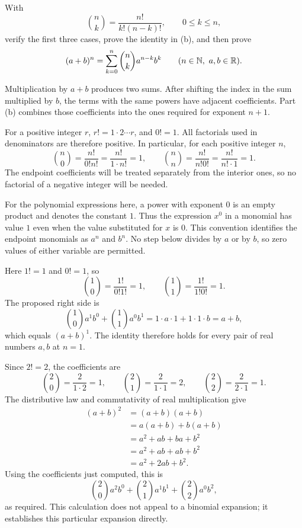 

\goal With
\[
 \binom{n}{k}=\frac{n!}{k!(n-k)!},\qquad 0\leq k\leq n,
\]
verify the first three cases, prove the identity in (b), and then prove
\[
 (a+b)^n=\sum_{k=0}^{n}\binom{n}{k}a^{n-k}b^k
 \qquad(n\in\mathbb{N},\ a,b\in\mathbb{R}).
\]

\idea Multiplication by $a+b$ produces two sums. After shifting
the index in the sum multiplied by $b$, the terms with the same powers
have adjacent coefficients. Part (b) combines those coefficients into
the ones required for exponent $n+1$.

For a positive integer $r$, $r!=1\cdot2\cdots r$, and $0!=1$.
All factorials used in denominators are therefore positive. In particular,
for each positive integer $n$,
\[
 \binom{n}{0}=\frac{n!}{0!n!}
 =\frac{n!}{1\cdot n!}=1,
 \qquad
 \binom{n}{n}=\frac{n!}{n!0!}
 =\frac{n!}{n!\cdot1}=1.
\]
The endpoint coefficients will be treated separately from the interior
ones, so no factorial of a negative integer will be needed.

For the polynomial expressions here, a power with exponent $0$ is an
empty product and denotes the constant $1$. Thus the expression $x^0$
in a monomial has value $1$ even when the value substituted for $x$ is
$0$. This convention identifies the endpoint monomials as $a^n$ and
$b^n$. No step below divides by $a$ or by $b$, so zero values of either
variable are permitted.

Here $1!=1$ and $0!=1$, so
\[
 \binom10=\frac{1!}{0!1!}=1,
 \qquad
 \binom11=\frac{1!}{1!0!}=1.
\]
The proposed right side is
\[
 \binom10a^1b^0+\binom11a^0b^1
 =1\cdot a\cdot1+1\cdot1\cdot b=a+b,
\]
which equals $(a+b)^1$. The identity therefore holds for every pair of
real numbers $a,b$ at $n=1$.

Since $2!=2$, the coefficients are
\[
 \binom20=\frac{2}{1\cdot2}=1,
 \qquad
 \binom21=\frac{2}{1\cdot1}=2,
 \qquad
 \binom22=\frac{2}{2\cdot1}=1.
\]
The distributive law and commutativity of real multiplication give
\begin{align*}
 (a+b)^2
 &=(a+b)(a+b)\\
 &=a(a+b)+b(a+b)\\
 &=a^2+ab+ba+b^2\\
 &=a^2+ab+ab+b^2\\
 &=a^2+2ab+b^2.
\end{align*}
Using the coefficients just computed, this is
\[
 \binom20a^2b^0+\binom21a^1b^1+\binom22a^0b^2,
\]
as required. This calculation does not appeal to a binomial expansion;
it establishes this particular expansion directly.

